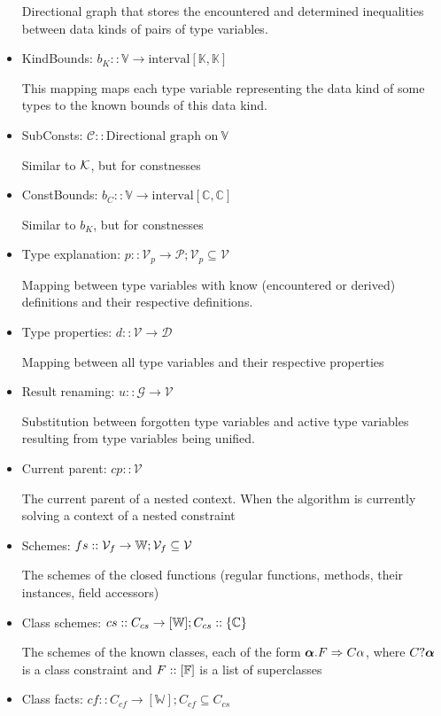 \begin{defn}
\begin{itemize}
        Directional graph that stores the encountered and determined inequalities between data kinds of pairs of type variables.
        \item KindBounds: $b_K :: \mathbb{V} \to \text{interval} \left[\mathbb{K}, \mathbb{K}\right]$
        
        This mapping maps each type variable representing the data kind of some types to the known bounds of this data kind.
        \item SubConsts: $\mathcal{C} :: \text{Directional graph on}\ \mathbb{V}$
        
        Similar to $\mathcal{K}$, but for constnesses
        \item ConstBounds: $b_C :: \mathbb{V} \to \text{interval} \left[\mathbb{C}, \mathbb{C}\right]$
        
        Similar to $b_K$, but for constnesses
        \item Type explanation: $p :: \mathcal{V}_p \to \mathcal{P}; \mathcal{V}_p \subseteq \mathcal{V}$
        
        Mapping between type variables with know (encountered or derived) definitions and their respective definitions.
        \item Type properties: $d :: \mathcal{V} \to \mathcal{D}$
        
        Mapping between all type variables and their respective properties
        \item Result renaming: $u :: \mathcal{G} \to \mathcal{V}$
        
        Substitution between forgotten type variables and active type variables resulting from type variables being unified.
        \item Current parent: $cp :: \mathcal{V}$
        
        The current parent of a nested context. When the algorithm is currently solving a context of a nested constraint
        \item Schemes: $fs :: \mathcal{V}_f \to \mathbb{W}; \mathcal V_f \subseteq \mathcal V$
        
        The schemes of the closed functions (regular functions, methods, their instances, field accessors)
        \item Class schemes: $cs :: C_{cs} \to [\mathbb{W}]; C_{cs} :: \{\mathbb{C}\}$
        
        The schemes of the known classes, each of the form $\boldsymbol{\alpha} . F \Rightarrow C \alpha$, where $C?  \boldsymbol{\alpha}$ is a class constraint and $F :: [\mathbb{F}]$ is a list of superclasses 
        \item Class facts: $cf :: C_{cf} \to [\mathbb{W}]; C_{cf} \subseteq C_{cs}$
        

\end{itemize}
\end{defn}
